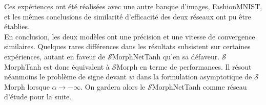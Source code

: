 \vspace{-1.8mm}
\noindent Ces expériences ont été réalisées avec une autre banque d'images, FashionMNIST, et les mêmes conclusions de similarité d'efficacité des deux réseaux ont pu être établies. \\

En conclusion, 
les deux modèles ont une précision et une vitesse de convergence similaires. 
Quelques rares différences dans les résultats subsistent sur certaines expériences, autant en faveur de $\mathcal{S}$MorphNetTanh qu'en sa défaveur. 
$\mathcal{S}$MorphTanh est donc équivalent à $\mathcal{S}$Morph en terme de performances. Il résout néanmoins le problème de signe devant $w$ dans la formulation asymptotique de $\mathcal{S}$Morph lorsque $\alpha \rightarrow -\infty$. On gardera alors le $\mathcal{S}$MorphNetTanh comme réseau d'étude pour la suite.
